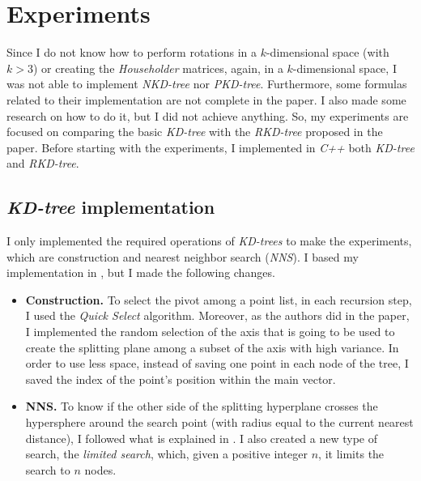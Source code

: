 \section{Experiments}

Since I do not know how to perform rotations in a $k$-dimensional space (with $k > 3$) or creating the \textit{Householder} matrices, again, in a $k$-dimensional space, I was not able to implement \textit{NKD-tree} nor \textit{PKD-tree}. Furthermore, some formulas related to their implementation are not complete in the paper. I also made some research on how to do it, but I did not achieve anything. So, my experiments are focused on comparing the basic \textit{KD-tree} with the \textit{RKD-tree} proposed in the paper. Before starting with the experiments, I implemented in \textit{C++} both \textit{KD-tree} and \textit{RKD-tree}.

\subsection{\textit{KD-tree} implementation}
I only implemented the required operations of \textit{KD-trees} to make the experiments, which are construction and nearest neighbor search (\textit{NNS}). I based my implementation in \cite{wiki}, but I made the following changes.
\begin{itemize}
    \item \textbf{Construction.} To select the pivot among a point list, in each recursion step, I used the \textit{Quick Select} algorithm. Moreover, as the authors did in the paper, I implemented the random selection of the axis that is going to be used to create the splitting plane among a subset of the axis with high variance. In order to use less space, instead of saving one point in each node of the tree, I saved the index of the point's position within the main vector.
    \item \textbf{NNS.} To know if the other side of the splitting hyperplane crosses the hypersphere around the search point (with radius equal to the current nearest distance), I followed what is explained in \cite{nns}. I also created a new type of search, the \textit{limited search}, which, given a positive integer $n$, it limits the search to $n$ nodes.
\end{itemize}


